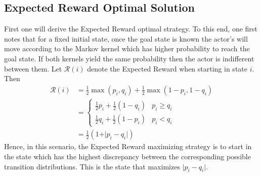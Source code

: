 \documentclass{article}
\newcommand{\Rr}{\mathcal{R}}
\begin{document}
\subsection{Expected Reward Optimal Solution}
First one will derive the Expected Reward optimal strategy. To this end, one first notes that for a fixed initial state, once the goal state is known the actor's will move according to the Markov kernel which has higher probability to reach the goal state. If both kernels yield the same probability then the actor is indifferent between them. Let $\Rr(i)$ denote the Expected Reward when starting in state $i$. Then
\begin{align*}
\Rr(i) 
	&= \frac{1}{2} \max(p_i,q_i) +\frac{1}{2} \max(1-p_i,1-q_i)\\
	&=\begin{cases}
		\frac{1}{2} p_i +\frac{1}{2} (1-q_i) & p_i\geq q_i\\
		\frac{1}{2} q_i +\frac{1}{2} (1-p_i) & p_i < q_i
		\end{cases}\\
	&=\frac{1}{2}(1+\vert p_i - q_i \vert) 	
\end{align*}
Hence, in this scenario, the Expected Reward maximizing strategy is to start in the state which has the highest discrepancy between the corresponding possible transition distributions. This is the state that maximizes $\vert p_i-q_i\vert$.
\end{document}
